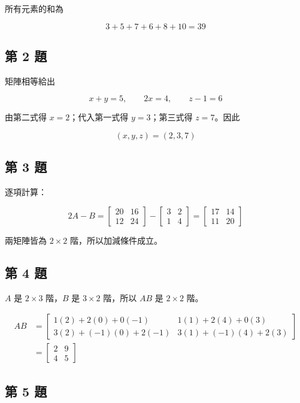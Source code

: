 \documentclass[11pt,a4paper]{article}
\begin{document}
所有元素的和為

\[
3+5+7+6+8+10=39
\]

\subsection{第 2 題}\label{ux7b2c-2-ux984c}

矩陣相等給出

\[
x+y=5,
\qquad
2x=4,
\qquad
z-1=6
\]

由第二式得 \(x=2\)；代入第一式得 \(y=3\)；第三式得 \(z=7\)。因此

\[
(x,y,z)=(2,3,7)
\]

\subsection{第 3 題}\label{ux7b2c-3-ux984c}

逐項計算：

\[
2A-B
=\begin{bmatrix}20&16\\12&24\end{bmatrix}
-\begin{bmatrix}3&2\\1&4\end{bmatrix}
=\begin{bmatrix}17&14\\11&20\end{bmatrix}
\]

兩矩陣皆為 \(2\times2\) 階，所以加減條件成立。

\subsection{第 4 題}\label{ux7b2c-4-ux984c}

\(A\) 是 \(2\times3\) 階，\(B\) 是 \(3\times2\) 階，所以 \(AB\) 是 \(2\times2\) 階。

\[
\begin{aligned}
AB
&=\begin{bmatrix}
1(2)+2(0)+0(-1)&1(1)+2(4)+0(3)\\
3(2)+(-1)(0)+2(-1)&3(1)+(-1)(4)+2(3)
\end{bmatrix}\\
&=\begin{bmatrix}2&9\\4&5\end{bmatrix}
\end{aligned}
\]

\subsection{第 5 題}\label{ux7b2c-5-ux984c}
\end{document}
